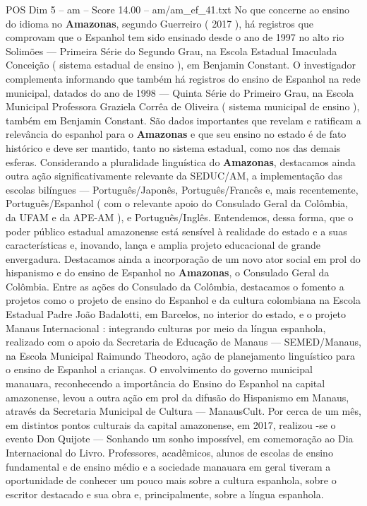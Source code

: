 \begin{textsample}{POS Dim 5 – am – Score 14.00 – am/am\_ef\_41.txt}
No que concerne ao ensino do idioma no \textbf{Amazonas}, segundo Guerreiro ( 2017 ), há registros que comprovam que o Espanhol tem sido ensinado desde o ano de 1997 no alto rio Solimões — Primeira Série do Segundo Grau, na Escola Estadual Imaculada Conceição ( sistema estadual de ensino ), em Benjamin Constant.
O investigador complementa informando que também há registros do ensino de Espanhol na rede municipal, datados do ano de 1998 — Quinta Série do Primeiro Grau, na Escola Municipal Professora Graziela Corrêa de Oliveira ( sistema municipal de ensino ), também em Benjamin Constant.
São dados importantes que revelam e ratificam a relevância do espanhol para o \textbf{Amazonas} e que seu ensino no estado é de fato histórico e deve ser mantido, tanto no sistema estadual, como nos das demais esferas.
Considerando a pluralidade linguística do \textbf{Amazonas}, destacamos ainda outra ação significativamente relevante da SEDUC/AM, a implementação das escolas bilíngues — Português/Japonês, Português/Francês e, mais recentemente, Português/Espanhol ( com o relevante apoio do Consulado Geral da Colômbia, da UFAM e da APE-AM ), e Português/Inglês.
Entendemos, dessa forma, que o poder público estadual amazonense está sensível à realidade do estado e a suas características e, inovando, lança e amplia projeto educacional de grande envergadura.
Destacamos ainda a incorporação de um novo ator social em prol do hispanismo e do ensino de Espanhol no \textbf{Amazonas}, o Consulado Geral da Colômbia.
Entre as ações do Consulado da Colômbia, destacamos o fomento a projetos como o projeto de ensino do Espanhol e da cultura colombiana na Escola Estadual Padre João Badalotti, em Barcelos, no interior do estado, e o projeto Manaus Internacional : integrando culturas por meio da língua espanhola, realizado com o apoio da Secretaria de Educação de Manaus — SEMED/Manaus, na Escola Municipal Raimundo Theodoro, ação de planejamento linguístico para o ensino de Espanhol a crianças.
O envolvimento do governo municipal manauara, reconhecendo a importância do Ensino do Espanhol na capital amazonense, levou a outra ação em prol da difusão do Hispanismo em Manaus, através da Secretaria Municipal de Cultura — ManausCult.
Por cerca de um mês, em distintos pontos culturais da capital amazonense, em 2017, realizou -se o evento Don Quijote — Sonhando um sonho impossível, em comemoração ao Dia Internacional do Livro.
Professores, acadêmicos, alunos de escolas de ensino fundamental e de ensino médio e a sociedade manauara em geral tiveram a oportunidade de conhecer um pouco mais sobre a cultura espanhola, sobre o escritor destacado e sua obra e, principalmente, sobre a língua espanhola.

\end{textsample}
